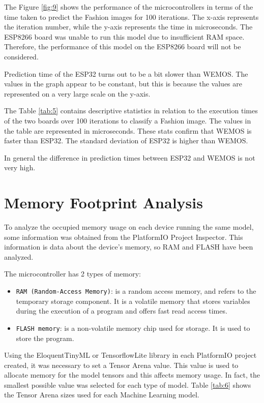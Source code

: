 \documentclass{article}
\begin{document}
The Figure \ref{fig:9} shows the performance of the microcontrollers in terms of the time taken to predict the Fashion images for 100 iterations. The x-axis represents the iteration number, while the y-axis represents the time in microseconds. The ESP8266 board was unable to run this model due to insufficient RAM space. Therefore, the performance of this model on the ESP8266 board will not be considered. 

Prediction time of the ESP32 turns out to be a bit slower than WEMOS. The values in the graph appear to be constant, but this is because the values are represented on a very large scale on the y-axis.

The Table \ref{tab:5} contains descriptive statistics in relation to the execution times of the two boards over 100 iterations to classify a Fashion image. The values in the table are represented in microseconds. These stats confirm that WEMOS is faster than ESP32. The standard deviation of ESP32 is higher than WEMOS. 

In general the difference in prediction times between ESP32 and WEMOS is not very high.

\section{Memory Footprint Analysis}

To analyze the occupied memory usage on each device running the same model, some information was obtained from the PlatformIO Project Inspector. This information is data about the device's memory, so RAM and FLASH have been analyzed.

The microcontroller has 2 types of memory:
\begin{itemize}
    \item \texttt{RAM (Random-Access Memory)}: is a random access memory, and refers to the temporary storage component. It is a volatile memory that stores variables during the execution of a program and offers fast read access times.
    \item \texttt{FLASH memory}: is a non-volatile memory chip used for storage. It is used to store the program.
\end{itemize}

Using the EloquentTinyML or TensorflowLite library in each PlatformIO project created, it was necessary to set a Tensor Arena value. This value is used to allocate memory for the model tensors and this affects memory usage. In fact, the smallest possible value was selected for each type of model. Table \ref{tab:6} shows the Tensor Arena sizes used for each Machine Learning model. 
\end{document}
